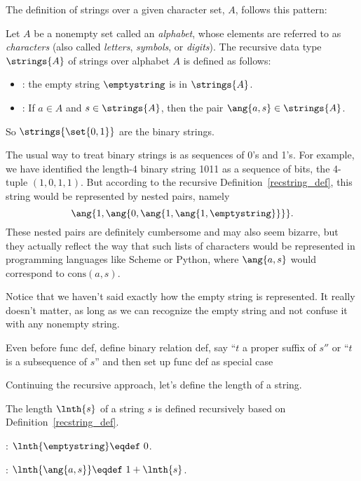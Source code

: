 The definition of strings over a given character set, $A$, follows this
pattern:

\begin{definition}\label{recstring_def}
  Let $A$ be a nonempty set called an \emph{alphabet}, whose elements
  are referred to as \emph{characters} (also called \emph{letters},
  \emph{symbols}, or \emph{digits}).  The recursive data type
  $\strings{A}$ of strings over alphabet $A$ is defined as follows:
\begin{itemize}
\item {}: the empty string $\emptystring$ is in $\strings{A}$.

\item {}: If $a \in A$ and $s \in \strings{A}$, then the pair
       $\ang{a,s} \in \strings{A}$.
\end{itemize}
\end{definition}
So $\strings{\set{0,1}}$ are the binary strings.

The usual way to treat binary strings is as sequences of 0's and 1's.
For example, we have identified the length-4 binary string 1011 as a
sequence of bits, the 4-tuple $(1,0,1,1)$.  But according to
the recursive Definition~\ref{recstring_def}, this string would be
represented by nested pairs, namely
\[
\ang{1,\ang{0,\ang{1,\ang{1,\emptystring}}}}.
\]
These nested pairs are definitely cumbersome and may also seem
bizarre, but they actually reflect the way that such lists of
characters would be represented in programming languages like Scheme
or Python, where $\ang{a,s}$ would correspond to $\text{cons}(a, s)$.

Notice that we haven't said exactly how the empty string is
represented.  It really doesn't matter, as long as we can recognize
the empty string and not confuse it with any nonempty string.

\begin{editingnotes}
Even before func def, define binary relation def, say ``$t$ a proper
suffix of $s''$ or ``$t$ is a subsequence of $s$'' and then set up
func def as special case
\end{editingnotes}

Continuing the recursive approach, let's define the length of a string.
\begin{definition}
The length $\lnth{s}$ of a string $s$ is defined recursively based
on Definition~\ref{recstring_def}.

\item {}:  $\lnth{\emptystring} \eqdef\ 0$.

\item {}: $\lnth{\ang{a,s}} \eqdef\ 1 + \lnth{s}$.

\end{definition}

